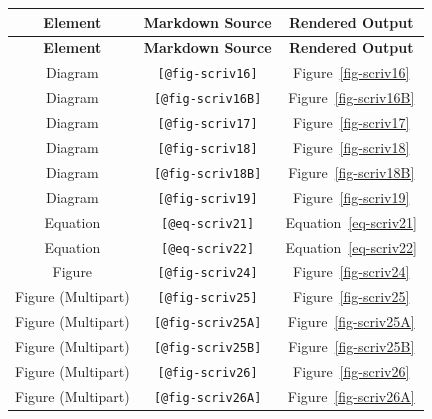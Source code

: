 \documentclass[
  12pt,
  a4paper,
  oneside,
  titlepage,
  toclink=all,
  toc=bibliography]{scrbook}
\theoremstyle{definition}
\theoremstyle{plain}
\theoremstyle{plain}
\theoremstyle{plain}
\theoremstyle{plain}
\theoremstyle{definition}
\theoremstyle{definition}
\theoremstyle{plain}
\theoremstyle{remark}
\begin{document}
\hypertarget{tbl-scriv13}{}
\begin{longtable}[]{@{}ccc@{}}
\toprule\noalign{}
\textbf{Element} & \textbf{Markdown Source} & \textbf{Rendered
Output} \\
\midrule\noalign{}
\endfirsthead
\toprule\noalign{}
\textbf{Element} & \textbf{Markdown Source} & \textbf{Rendered
Output} \\
\midrule\noalign{}
\endhead
\bottomrule\noalign{}
\endlastfoot
Diagram & \texttt{{[}@fig-scriv16{]}} &
\protect\hypertarget{cite_24}{}{\label{cite_24}Figure~\ref{fig-scriv16}} \\
Diagram & \texttt{{[}@fig-scriv16B{]}} &
\protect\hypertarget{cite_25}{}{\label{cite_25}Figure~\ref{fig-scriv16B}} \\
Diagram & \texttt{{[}@fig-scriv17{]}} &
\protect\hypertarget{cite_26}{}{\label{cite_26}Figure~\ref{fig-scriv17}} \\
Diagram & \texttt{{[}@fig-scriv18{]}} &
\protect\hypertarget{cite_27}{}{\label{cite_27}Figure~\ref{fig-scriv18}} \\
Diagram & \texttt{{[}@fig-scriv18B{]}} &
\protect\hypertarget{cite_28}{}{\label{cite_28}Figure~\ref{fig-scriv18B}} \\
Diagram & \texttt{{[}@fig-scriv19{]}} &
\protect\hypertarget{cite_29}{}{\label{cite_29}Figure~\ref{fig-scriv19}} \\
Equation & \texttt{{[}@eq-scriv21{]}} &
\protect\hypertarget{cite_30}{}{\label{cite_30}Equation~\ref{eq-scriv21}} \\
Equation & \texttt{{[}@eq-scriv22{]}} &
\protect\hypertarget{cite_31}{}{\label{cite_31}Equation~\ref{eq-scriv22}} \\
Figure & \texttt{{[}@fig-scriv24{]}} &
\protect\hypertarget{cite_32}{}{\label{cite_32}Figure~\ref{fig-scriv24}} \\
Figure (Multipart) & \texttt{{[}@fig-scriv25{]}} &
\protect\hypertarget{cite_33}{}{\label{cite_33}Figure~\ref{fig-scriv25}} \\
Figure (Multipart) & \texttt{{[}@fig-scriv25A{]}} &
\protect\hypertarget{cite_34}{}{\label{cite_34}Figure~\ref{fig-scriv25A}} \\
Figure (Multipart) & \texttt{{[}@fig-scriv25B{]}} &
\protect\hypertarget{cite_35}{}{\label{cite_35}Figure~\ref{fig-scriv25B}} \\
Figure (Multipart) & \texttt{{[}@fig-scriv26{]}} &
\protect\hypertarget{cite_36}{}{\label{cite_36}Figure~\ref{fig-scriv26}} \\
Figure (Multipart) & \texttt{{[}@fig-scriv26A{]}} &
\protect\hypertarget{cite_37}{}{\label{cite_37}Figure~\ref{fig-scriv26A}} \\

\end{longtable}
\end{document}
